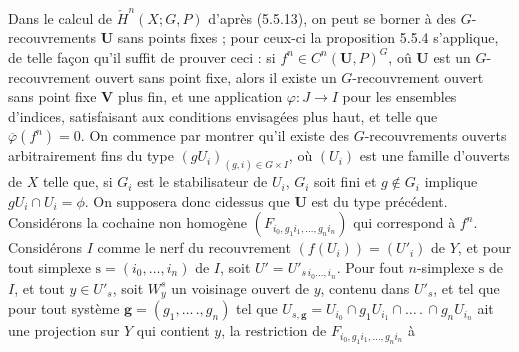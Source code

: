 Dans le calcul de $\check H^n(X;G,P)$ d'après (5.5.13), on peut se borner à
des $G$-recouvrements ${\mathbf U}$ sans points fixes ; pour ceux-ci la
proposition 5.5.4 s'applique, de telle façon qu'il suffit de prouver ceci : si
$f^n\in C^n({\mathbf U},P)^G$, oû ${\mathbf U}$ est un $G$-recouvrement ouvert
sans point fixe, alors il existe un $G$-recouvrement ouvert sans point fixe
${\mathbf V}$ plus fin, et une application $\varphi:J\to I$ pour les ensembles
d'indices, satisfaisant aux conditions envisagées plus haut, et telle que
$\overline\varphi(f^n)=0$. On commence par montrer qu'il existe des
$G$-recouvrements ouverts arbitrairement fins du type
$(gU_i)_{(g,i)\in G\times I}$, où $(U_i)$ est une famille d'ouverts de $X$
telle que, si $G_i$ est le stabilisateur de $U_i$, $G_i$ soit fini et
$g\notin G_i$ implique $gU_i\cap U_i=\phi$. On supposera donc cidessus que
${\mathbf U}$ est du type précédent.
Considérons la cochaine non homogène
$(F_{i_0,g_1i_1,\ldots,g_ni_n})$ qui correspond à $f^n$. Considérons $I$
comme le nerf du recouvrement $(f(U_i))=(U'_i)$ de $Y$, et pour tout simplexe
$\mathrm s=(i_0,\ldots,i_n)$ de $I$, soit $U'=U'_{s\,i_0\ldots,i_n}$. Pour fout
$n$-simplexe $\mathrm s$ de $I$, et tout $y\in U'_s$, soit $W^s_y$ un voisinage
ouvert de $y$, contenu dans $U'_s$, et tel que pour tout système
$\mathbf g=(g_1,\ldots\,.,g_n)$ tel que
$U_{s,\mathbf g}=U_{i_0}\cap g_1U_{i_1}\cap\ldots\,.\,\cap g_nU_{i_n}$ ait une
projection sur $Y$ qui contient $y$, la restriction de
$F_{i_0,g_1i_1,\ldots,g_ni_n}$ à

